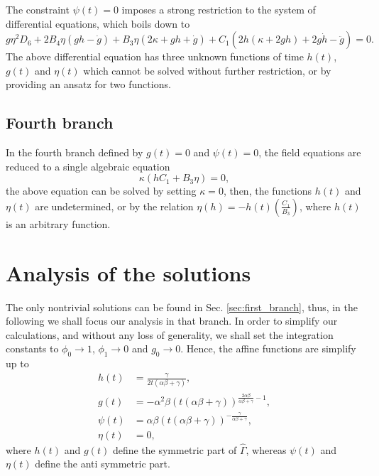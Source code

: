 The constraint $\psi(t)=0$ imposes a strong restriction to the system of differential equations, which boils down to 
\begin{dmath}
    g\eta^2D_6 + 2B_4\eta \left(gh - \dot{g}\right) + B_3\eta\left(2\kappa + gh + \dot{g}\right) + 
    C_1\left(2h\left(\kappa + 2gh\right) + 2g\dot{h} - \ddot{g}\right) = 0.
\end{dmath}
The above differential equation has three unknown functions of time $h(t)$, $g(t)$ and $\eta(t)$ which cannot be solved without 
further restriction, or by providing an ansatz for two functions.

\subsection{Fourth branch}

In the fourth branch defined by $g(t) = 0$ and $\psi (t) = 0$, the field equations are reduced
to a single algebraic equation
\begin{equation}
    \kappa\left(hC_1 + B_3\eta\right) = 0,
\end{equation}
the above equation can be solved by setting $\kappa = 0$, then, the functions $h(t)$ and $\eta(t)$ are undetermined,
or by the relation $\eta(h) = - h(t)\left(\frac{C_1}{B_3}\right)$, where $h(t)$ is an arbitrary function.

\section{Analysis of the solutions}
\label{sec:analysis}

The only nontrivial solutions can be found in Sec. \ref{sec:first_branch}, thus, in the following we shall
focus our analysis in that branch. In order to simplify our calculations, and without any loss of generality, we shall
set the integration constants to $\phi_0 \to 1$, $\phi_1 \to 0$ and $g_0 \to 0$. Hence, the affine functions 
are simplify up to
\begin{align}
	h(t) & = \frac{\gamma}{2t\left(\alpha\beta + \gamma\right)}, \label{sol_h}\\
	g(t) & = -\alpha^2\beta \left(t\left(\alpha\beta + \gamma\right)\right)^{\frac{2\alpha\beta}{\alpha\beta + \gamma} -1}, \label{sol_g} \\
	\psi(t) & = \alpha\beta\left(t\left(\alpha\beta + \gamma\right)\right)^{-\frac{\gamma}{\alpha\beta + \gamma}},  \label{sol_p}\\ 
	\eta(t) & = 0, \label{sol_n}
\end{align}
where $h(t)$ and $g(t)$ define the symmetric part of $\hat{\Gamma}$, whereas
$\psi(t)$ and $\eta(t)$ define the anti symmetric part.

